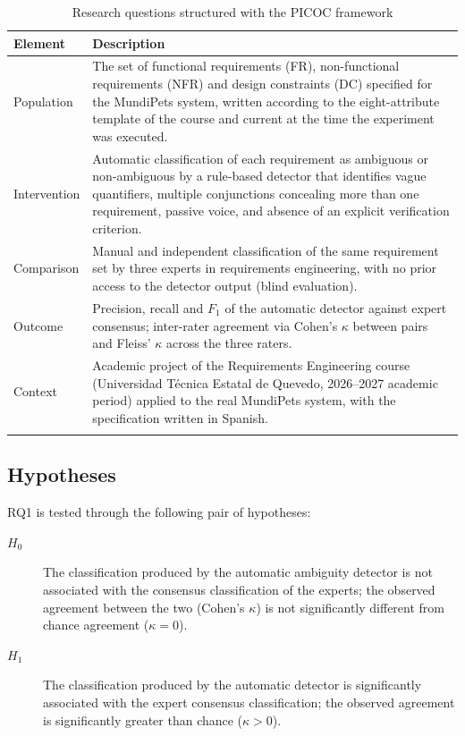 \documentclass[pdflatex,sn-mathphys-num]{sn-jnl}
\theoremstyle{thmstyleone}%
\theoremstyle{thmstyletwo}%
\theoremstyle{thmstylethree}%
\begin{document}
	\begin{table}[h]
		\caption{Research questions structured with the PICOC framework}\label{tab:picoc}
		\begin{tabular}{@{}p{2.0cm}p{9.5cm}@{}}
			\toprule
			Element & Description \\
			\midrule
			Population & The set of functional requirements (FR), non-functional
			requirements (NFR) and design constraints (DC) specified for the MundiPets
			system, written according to the eight-attribute template of the course and
			current at the time the experiment was executed. \\
			Intervention & Automatic classification of each requirement as ambiguous or
			non-ambiguous by a rule-based detector that identifies vague quantifiers,
			multiple conjunctions concealing more than one requirement, passive voice, and
			absence of an explicit verification criterion. \\
			Comparison & Manual and independent classification of the same requirement set
			by three experts in requirements engineering, with no prior access to the
			detector output (blind evaluation). \\
			Outcome & Precision, recall and $F_1$ of the automatic detector against expert
			consensus; inter-rater agreement via Cohen's $\kappa$ between pairs and Fleiss'
			$\kappa$ across the three raters. \\
			Context & Academic project of the Requirements Engineering course (Universidad
			Técnica Estatal de Quevedo, 2026--2027 academic period) applied to the real
			MundiPets system, with the specification written in Spanish. \\
			\botrule
		\end{tabular}
	\end{table}
	
	\subsection{Hypotheses}\label{subsec:hypotheses}
	
	RQ1 is tested through the following pair of hypotheses:
	
	\begin{description}
		\item[$H_0$] The classification produced by the automatic ambiguity detector
		is not associated with the consensus classification of the experts; the
		observed agreement between the two (Cohen's $\kappa$) is not significantly
		different from chance agreement ($\kappa = 0$).
		\item[$H_1$] The classification produced by the automatic detector is
		significantly associated with the expert consensus classification; the
		observed agreement is significantly greater than chance ($\kappa > 0$).
	\end{description}
	
\end{document}
